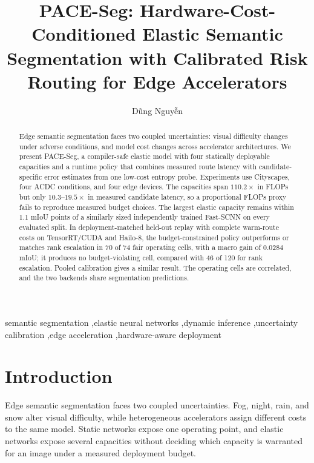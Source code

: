 \documentclass[a4paper,review,12pt]{elsarticle}
\newcommand{\method}{PACE-Seg}
\newcommand{\miou}{mIoU}
\begin{document}
\begin{frontmatter}

\title{PACE-Seg: Hardware-Cost-Conditioned Elastic Semantic Segmentation with Calibrated Risk Routing for Edge Accelerators}

\author{D\~{u}ng Nguy\~{\^{e}}n}

\begin{abstract}
Edge semantic segmentation faces two coupled uncertainties: visual difficulty changes under adverse conditions, and model cost changes across accelerator architectures. We present \method, a compiler-safe elastic model with four statically deployable capacities and a runtime policy that combines measured route latency with candidate-specific error estimates from one low-cost entropy probe. Experiments use Cityscapes, four ACDC conditions, and four edge devices. The capacities span $110.2\times$ in FLOPs but only $10.3$--$19.5\times$ in measured candidate latency, so a proportional FLOPs proxy fails to reproduce measured budget choices. The largest elastic capacity remains within 1.1 \miou{} points of a similarly sized independently trained Fast-SCNN on every evaluated split. In deployment-matched held-out replay with complete warm-route costs on TensorRT/CUDA and Hailo-8, the budget-constrained policy outperforms or matches rank escalation in 70 of 74 fair operating cells, with a macro gain of 0.0284 \miou{}; it produces no budget-violating cell, compared with 46 of 120 for rank escalation. Pooled calibration gives a similar result. The operating cells are correlated, and the two backends share segmentation predictions.
\end{abstract}

\begin{keyword}
semantic segmentation \sep elastic neural networks \sep dynamic inference \sep uncertainty calibration \sep edge acceleration \sep hardware-aware deployment
\end{keyword}

\end{frontmatter}

\section{Introduction}
\label{sec:introduction}

Edge semantic segmentation faces two coupled uncertainties. Fog, night, rain, and snow alter visual difficulty, while heterogeneous accelerators assign different costs to the same model. Static networks expose one operating point, and elastic networks expose several capacities without deciding which capacity is warranted for an image under a measured deployment budget.
\end{document}
